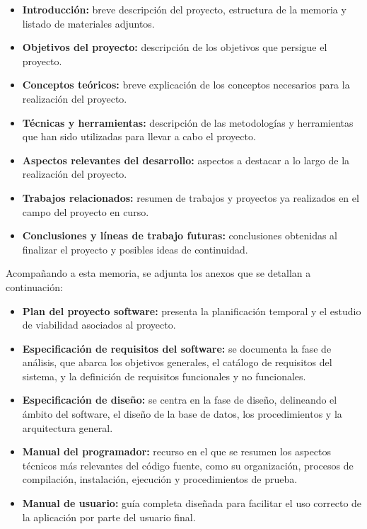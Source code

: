\begin{itemize}
\tightlist
\item
  \textbf{Introducción:} breve descripción del proyecto, estructura de la memoria y listado de materiales adjuntos.
\item
  \textbf{Objetivos del proyecto:} descripción de los objetivos que persigue el proyecto.
\item
  \textbf{Conceptos teóricos:} breve explicación de los conceptos necesarios para la realización del proyecto.
\item
  \textbf{Técnicas y herramientas:} descripción de las metodologías y herramientas que han sido utilizadas para llevar a cabo el proyecto.
\item
  \textbf{Aspectos relevantes del desarrollo:} aspectos a destacar a lo largo de la realización del proyecto.
\item
  \textbf{Trabajos relacionados:} resumen de trabajos y proyectos ya realizados en el campo del proyecto en curso.
\item
  \textbf{Conclusiones y líneas de trabajo futuras:} conclusiones obtenidas al finalizar el proyecto y posibles ideas de continuidad.
\end{itemize}

Acompañando a esta memoria, se adjunta los anexos que se detallan a continuación:

\begin{itemize}
\tightlist
\item
  \textbf{Plan del proyecto software:} presenta la planificación temporal y el estudio de viabilidad asociados al proyecto.
\item
  \textbf{Especificación de requisitos del software:} se documenta la fase de análisis, que abarca los objetivos generales, el catálogo de requisitos del sistema, y la definición de requisitos funcionales y no funcionales.
\item
  \textbf{Especificación de diseño:} se centra en la fase de diseño, delineando el ámbito del software, el diseño de la base de datos, los procedimientos y la arquitectura general.
\item
  \textbf{Manual del programador:} recurso en el que se resumen los aspectos técnicos más relevantes del código fuente, como su organización, procesos de compilación, instalación, ejecución y procedimientos de prueba.
\item
  \textbf{Manual de usuario:} guía completa diseñada para facilitar el uso correcto de la aplicación por parte del usuario final.
\end{itemize}

